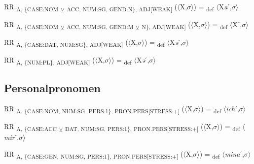 {\begin{exe}
 RR \textsubscript{A, \{CASE:NOM} \textsubscript{${\veebar}$}\textsubscript{ ACC, NUM:SG, GEND:N\}, ADJ[WEAK]} ($\langle$X,$\sigma $$\rangle$) = \textsubscript{def} $\langle$X\textit{a}ˊ,$\sigma $$\rangle$
\end{exe}

\begin{exe}
 RR \textsubscript{A, \{CASE:NOM} \textsubscript{${\veebar}$}\textsubscript{ ACC, NUM:SG, GEND:M} \textsubscript{${\veebar}$}\textsubscript{ N\}, ADJ[WEAK]} ($\langle$X,$\sigma $$\rangle$) = \textsubscript{def} $\langle$Xˊ,$\sigma $$\rangle$
\end{exe}

\begin{exe}
 RR \textsubscript{A, \{CASE:DAT, NUM:SG\}, ADJ[WEAK]} ($\langle$X,$\sigma $$\rangle$) = \textsubscript{def} $\langle$X\textit{ə}ˊ,$\sigma $$\rangle$
\end{exe}

\begin{exe}
 RR \textsubscript{A, \{NUM:PL\}, ADJ[WEAK]} ($\langle$X,$\sigma $$\rangle$) = \textsubscript{def} $\langle$X\textit{ə}ˊ,$\sigma $$\rangle$
\end{exe}

\subsection{Personalpronomen}

\begin{exe}
 RR \textsubscript{A, \{CASE:NOM, NUM:SG, PERS:1\}, PRON.PERS[STRESS:+]} ($\langle$X,$\sigma $$\rangle$) = \textsubscript{def} $\langle$\textit{ich}ˊ,$\sigma $$\rangle$
\end{exe}

\begin{exe}
 RR \textsubscript{A, \{CASE:ACC} \textsubscript{${\veebar}$}\textsubscript{ DAT, NUM:SG, PERS:1\}, PRON.PERS[STRESS:+]} ($\langle$X,$\sigma $$\rangle$) = \textsubscript{def} $\langle$\textit{mir}ˊ,$\sigma $$\rangle$
\end{exe}

\begin{exe}
 RR \textsubscript{A, \{CASE:GEN, NUM:SG, PERS:1\}, PRON.PERS[STRESS:+]} ($\langle$X,$\sigma $$\rangle$) = \textsubscript{def} $\langle$\textit{mina}ˊ,$\sigma $$\rangle$
\end{exe}

}

